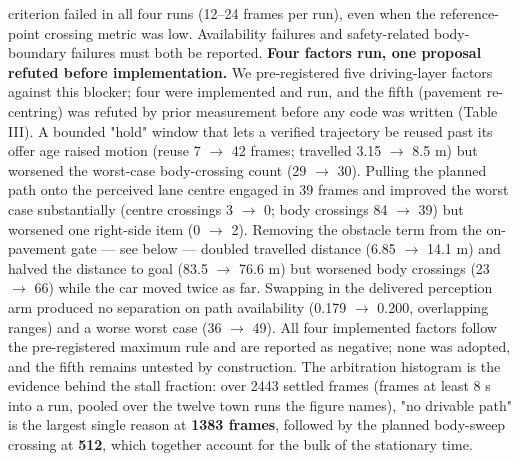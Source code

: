 \documentclass[journal]{IEEEtran}
\begin{document}
criterion failed in all four runs (12--24 frames per run), even when the reference-point crossing metric
was low. Availability failures and safety-related body-boundary failures must both be reported.
\textbf{Four factors run, one proposal refuted before implementation.} We pre-registered five driving-layer
factors against this blocker; four were implemented and run, and the fifth (pavement re-centring) was
refuted by prior measurement before any code was written (Table III). A bounded "hold" window that lets a verified trajectory be reused past its
offer age raised motion (reuse 7 $\rightarrow$ 42 frames; travelled 3.15 $\rightarrow$ 8.5 m) but worsened the worst-case
body-crossing count (29 $\rightarrow$ 30). Pulling the planned path onto the perceived lane centre engaged in 39
frames and improved the worst case substantially (centre crossings 3 $\rightarrow$ 0; body crossings 84 $\rightarrow$ 39)
but worsened one right-side item (0 $\rightarrow$ 2). Removing the obstacle term from the on-pavement gate --- see
below --- doubled travelled distance (6.85 $\rightarrow$ 14.1 m) and halved the distance to goal (83.5 $\rightarrow$ 76.6 m)
but worsened body crossings (23 $\rightarrow$ 66) while the car moved twice as far. Swapping in the delivered
perception arm produced no separation on path availability (0.179 $\rightarrow$ 0.200, overlapping ranges) and a
worse worst case (36 $\rightarrow$ 49). All four implemented factors follow the pre-registered maximum rule and are reported as negative; none was
adopted, and the fifth remains untested by construction.
The arbitration histogram is the evidence behind the stall fraction: over 2443 settled frames (frames at
least 8 s into a run, pooled over the twelve town runs the figure names), "no drivable path" is the largest
single reason at \textbf{1383 frames}, followed by the planned body-sweep crossing at \textbf{512}, which together
account for the bulk of the stationary time.
\end{document}
